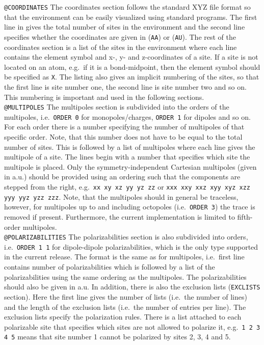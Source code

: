 \noindent\texttt{@COORDINATES}\newline
The coordinates section follows the standard XYZ file format so that the
environment can be easily visualized using standard programs. The first line in
gives the total number of sites in the environment and the second line
specifies whether the coordinates are given in \angstrom{} (\verb|AA|) or
\bohr{} (\verb|AU|). The rest of the coordinates section is a list of the sites in
the environment where each line contains the element symbol and x-, y- and
z-coordinates of a site. If a site is not located on an atom, e.g.\ if it is a
bond-midpoint, then the element symbol should be specified as \verb|X|. The
listing also gives an implicit numbering of the sites, so that the first line
is site number one, the second line is site number two and so on. This
numbering is important and used in the following sections.\\

\noindent\texttt{@MULTIPOLES}\newline
The multipoles section is subdivided into the orders of the
multipoles, i.e.\ \verb|ORDER 0| for monopoles/charges, \verb|ORDER 1|
for dipoles and so on.  For each order there is a number specifying
the number of multipoles of that specific order. Note, that this
number does not have to be equal to the total number of sites. This is
followed by a list of multipoles where each line gives the multipole
of a site. The lines begin with a number that specifies which site the
multipole is placed. Only the symmetry-independent Cartesian
multipoles (given in a.u.) should be provided using an ordering such
that the components are stepped from the right, e.g.\
\verb|xx xy xz yy yz zz| or \verb|xxx xxy xxz xyy xyz xzz yyy yyz yzz zzz|.
Note, that the multipoles should in general be traceless, however, for
multipoles up to and including octopoles (i.e.\ \verb|ORDER 3|) the
trace is removed if present. Furthermore, the current implementation is
limited to fifth-order multipoles.\\

\noindent\texttt{@POLARIZABILITIES}\newline
The polarizabilities section is also subdivided into orders,
i.e.\ \verb|ORDER 1 1| for dipole-dipole polarizabilities, which is the only
type supported in the current release. The format is the same as for
multipoles, i.e.\ first line contains number of polarizabilities which is
followed by a list of the polarizabilities using the same ordering as the
multipoles. The polarizabilities should also be given in a.u. In addition,
there is also the exclusion lists (\verb|EXCLISTS|
section). Here the first line gives the number of lists (i.e.\ the number of
lines) and the length of the exclusion lists (i.e.\ the number of entries per
line). The exclusion lists specify the polarization rules. There is a list
attached to each polarizable site that specifies which sites are not allowed
to polarize it, e.g.\ \verb|1 2 3 4 5| means that site number 1 cannot be
polarized by sites 2, 3, 4 and 5.\\

